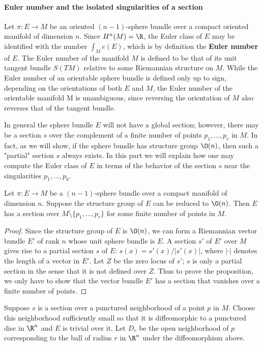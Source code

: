 \paragraph{Euler number and the isolated singularities of a section}
Let $\pi:E\to M$ be an oriented $(n-1)$-sphere bundle over a compact oriented manifold of dimension $n$. Since $H^n(M)=\R$, the Euler class of $E$ may be identified 
with the number $\int_Me(E)$, which is by definition the \textbf{Euler number} of $E$. The Euler number of the manifold $M$ is defined to be that of its unit tangent 
bundle $S(TM)$ relative to some Riemannian structure on $M$. While the Euler number of an orientable sphere bundle is defined only up to sign, depending on the 
orientations of both $E$ and $M$, the Euler number of the orientable manifold M is unambiguous, since reversing the orientation of $M$ also reverses that of the 
tangent bundle.\par
In general the sphere bundle $E$ will not have a global section; however, there may be a section $s$ over the complement of a finite number of points $p_1,\dots,p_r$ in 
$M$. In fact, as we will show, if the sphere bundle has structure group $\O(n)$, then such a "partial" section $s$ always exists. In this part we will explain how one 
may compute the Euler class of $E$ in terms of the behavior of the section $s$ near the singularities $p_1,\dots,p_k$.
\begin{proposition}
Let $\pi:E\to M$ be a $(n-1)$-sphere bundle over a compact manifold of dimension $n$. Suppose the structure group of $E$ can be reduced to $\O(n)$. Then $E$ has a 
section over $M\setminus\{p_1,\dots,p_r\}$ for some finite number of points in $M$.
\end{proposition}
\begin{proof}
Since the structure group of $E$ is $\O(n)$, we can form a Riemannian vector bundle $E'$ of rank $n$ whose unit sphere bundle is $E$. A section $s'$ of $E'$ over $M$ 
gives rise to a partial section $s$ of $E$: $s(x)=s'(x)/|s'(x)|$, where $|\cdot|$ denotes the length of a vector in $E'$. Let $Z$ be the zero locus of $s'$; $s$ is 
only a partial section in the sense that it is not defined over $Z$. Thus to prove the proposition, we only have to show that the vector bundle $E'$ has a section
that vanishes over a finite number of points.
\end{proof}
Suppose $s$ is a section over a punctured neighborhood of a point $p$ in $M$. Choose this neighborhood sufficiently small so that it is diffeomorphic to a punctured 
disc in $\R^n$ and $E$ is trivial over it. Let $D_r$ be the open neighborhood of $p$ corresponding to the ball of radius $r$ in $\R^n$ under the diffeomorphism above. 
